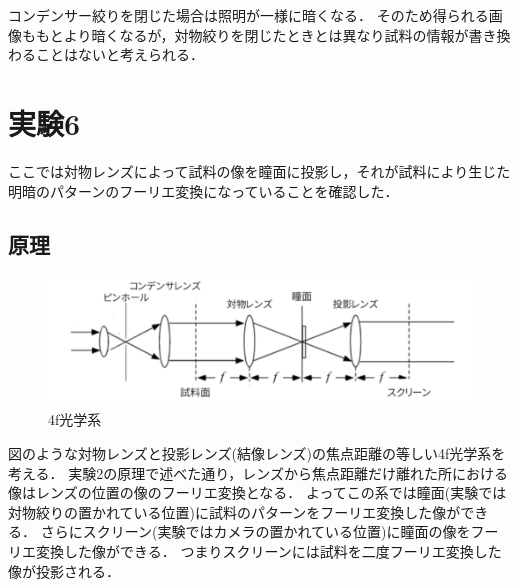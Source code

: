 \documentclass[titlepage]{jsarticle}
\begin{document}
コンデンサー絞りを閉じた場合は照明が一様に暗くなる．
そのため得られる画像ももとより暗くなるが，対物絞りを閉じたときとは異なり試料の情報が書き換わることはないと考えられる．

\section{実験6}
ここでは対物レンズによって試料の像を瞳面に投影し，それが試料により生じた明暗のパターンのフーリエ変換になっていることを確認した．

\subsection{原理}

\begin{figure}[htbp]
    \centering
    \includegraphics[width=14cm]{4fsystem.png}
    \caption{4f光学系}
    \label{fig:4fsystem}
\end{figure}

図のような対物レンズと投影レンズ(結像レンズ)の焦点距離の等しい4f光学系を考える．
実験2の原理で述べた通り，レンズから焦点距離だけ離れた所における像はレンズの位置の像のフーリエ変換となる．
よってこの系では瞳面(実験では対物絞りの置かれている位置)に試料のパターンをフーリエ変換した像ができる．
さらにスクリーン(実験ではカメラの置かれている位置)に瞳面の像をフーリエ変換した像ができる．
つまりスクリーンには試料を二度フーリエ変換した像が投影される．
\end{document}
